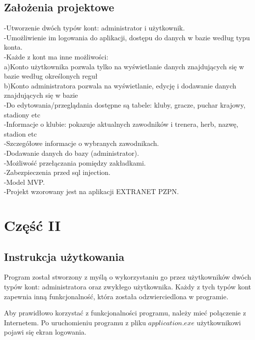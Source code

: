 \documentclass[12pt,a4paper]{article}
\begin{document}
    \subsection{Założenia projektowe}
    -Utworzenie dwóch typów kont: administrator i  użytkownik. \\
    -Umożliwienie im logowania do aplikacji, dostępu do danych w bazie według typu konta. \\
    -Każde z kont ma inne możliwości:\\
    a)Konto użytkownika pozwala tylko na wyświetlanie danych znajdujących się w bazie według określonych reguł\\
    b)Konto administratora pozwala na wyświetlanie, edycję i dodawanie danych znajdujących się w bazie \\
    -Do edytowania/przeglądania dostępne są tabele: kluby, gracze, puchar krajowy, stadiony etc \\
    -Informacje o klubie: pokazuje aktualnych zawodników i trenera, herb, nazwę, stadion etc \\
    -Szczegółowe informacje o wybranych zawodnikach. \\
    -Dodawanie danych do bazy (administrator). \\
    -Możliwość przełączania pomiędzy zakładkami. \\
    -Zabezpieczenia przed sql injection. \\
    -Model MVP. \\
    -Projekt wzorowany jest na aplikacji EXTRANET PZPN. \\
    
    \newpage
    \section{Część II}
    \subsection{Instrukcja użytkowania}
    Program został stworzony z myślą o wykorzystaniu go przez użytkowników dwóch typów kont: administratora oraz zwykłego użytkownika. Każdy z tych typów kont zapewnia inną funkcjonalność, która została odzwierciedlona w programie.
    
    Aby prawidłowo korzystać z funkcjonalności programu, należy mieć połączenie z Internetem. Po uruchomieniu programu z pliku $application.exe$ użytkownikowi pojawi się ekran logowania.
    
\end{document}
